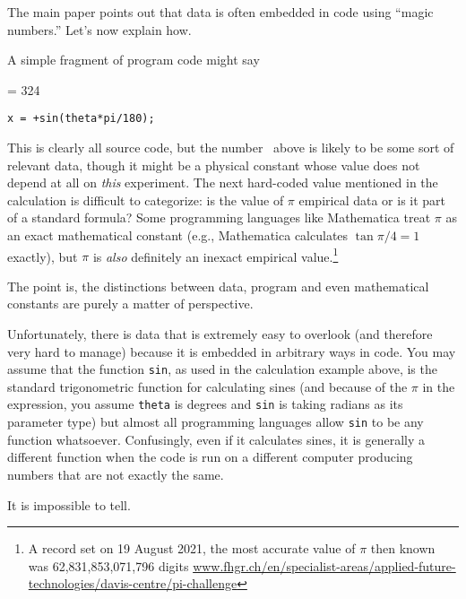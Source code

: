 \documentclass[10pt,a4paper]{article}
\begin{document}
The main paper points out that data is often embedded in code using ``magic numbers.'' Let's now explain how. 

A simple fragment of program code might say

\newcount \magicNumber \magicNumber = 324
\begin{center}\texttt{x = \the\magicNumber+sin(theta*pi/180);}\end{center}

This is clearly all source code, but the number \the\magicNumber\ above is likely to be some sort of relevant data, though it might be a physical constant whose value does not depend at all on \emph{this\/} experiment. The next hard-coded value mentioned in the calculation is difficult to categorize: is the value of $\pi$ empirical data or is it part of a standard formula? Some programming languages like Mathematica treat $\pi$ as an exact mathematical constant (e.g., Mathematica calculates $\tan\pi/4 = 1$ exactly), but $\pi$ is \emph{also\/} definitely an inexact empirical value.\footnote{A record set on 19 August 2021, the most accurate value of $\pi$ then known was 62,831,853,071,796 digits %
\url{www.fhgr.ch/en/specialist-areas/applied-future-technologies/davis-centre/pi-challenge}} 

The point is, the distinctions between data, program and even mathematical constants are purely a matter of perspective.

Unfortunately, there is data that is extremely easy to overlook (and therefore very hard to manage) because it is embedded in arbitrary ways in code. You may assume that the function \texttt{sin}, as used in the calculation example above, is the standard trigonometric function for calculating sines (and because of the $\pi$ in the expression, you assume \texttt{theta} is degrees and \texttt{sin} is taking radians as its parameter type) but almost all programming languages allow \texttt{sin} to be any function whatsoever. Confusingly, even if it calculates sines, it is generally a different function when the code is run on a different computer producing numbers that are not exactly the same.

It is impossible to tell. 
\end{document}
